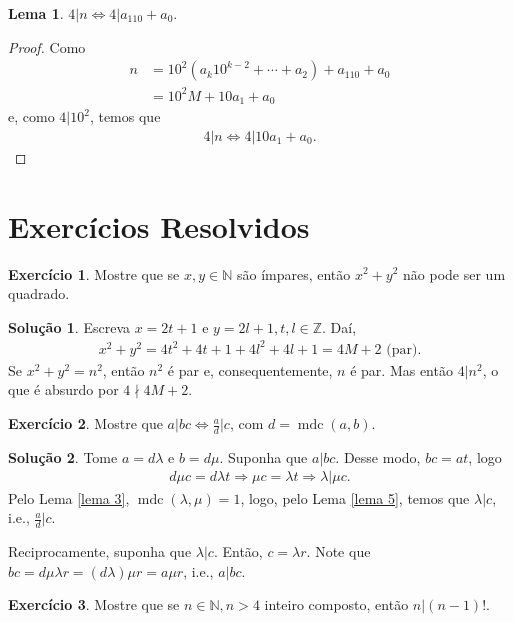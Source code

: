 \documentclass[a4paper,11pt,twoside, leqno]{article}
\DeclareMathOperator{\mdc}{mdc}
\theoremstyle{definition}
\newtheorem{lemma}[theorem]{Lema}
\newtheorem{exercise}{Exercício}
\newtheorem*{solution}{Solução}
\begin{document}
\begin{lemma}
	$4|n \Leftrightarrow 4|a_110 + a_0$.
\end{lemma}
\begin{proof}
	Como 
	\begin{align*}
	n &= 10^2(a_k10^{k-2} + \cdots + a_2) + a_110 + a_0 \\
	&= 10^2M + 10a_1 + a_0
	\end{align*}
	e, como $4|10^2$, temos que
	\begin{align*}
	4|n \Leftrightarrow 4|10a_1 + a_0.
	\end{align*}
\end{proof}
\section{Exercícios Resolvidos}
\begin{exercise}
	Mostre que se $x,y\in\mathbb{N}$ são ímpares, então $x^2+y^2$ não pode ser um quadrado.
\end{exercise}
\begin{solution}
	Escreva $x = 2t+1$ e $y = 2l+1, t,l\in\mathbb{Z}$. Daí,
	\begin{align*}
	x^2 + y^2 = 4t^2 + 4t + 1 + 4l^2 + 4l + 1 = 4M + 2\text{ (par)}.
	\end{align*}
	Se $x^2 + y^2 = n^2$, então $n^2$ é par e, consequentemente, $n$ é par. Mas então $4|n^2$, o que é absurdo por $4\nmid 4M + 2$.
\end{solution}
\begin{exercise}
	Mostre que $a|bc \Leftrightarrow \displaystyle{ \frac{a}{d}\Big| c }$, com $d = \mdc(a,b)$.
\end{exercise}
\begin{solution}
	Tome $a = d\lambda$ e $b = d\mu$. Suponha que $a|bc$. Desse modo, $bc = at$, logo
	\begin{align*}
	d\mu c = d\lambda t \Rightarrow \mu c = \lambda t \Rightarrow \lambda|\mu c.
	\end{align*}
	Pelo Lema \eqref{lema 3}, $\mdc(\lambda,\mu) = 1$, logo, pelo Lema \eqref{lema 5}, temos que $\lambda|c$, i.e., $\displaystyle{ \frac{a}{d}\Big| c }$.
	
	Reciprocamente, suponha que $\lambda |c$. Então, $c = \lambda r$. Note que $bc = d\mu\lambda r = (d\lambda)\mu r = a\mu r$, i.e., $a|bc$.
\end{solution}
\begin{exercise}
	Mostre que se $n\in\mathbb{N}, n>4$ inteiro composto, então $n|(n-1)!$.
\end{exercise}
\end{document}

